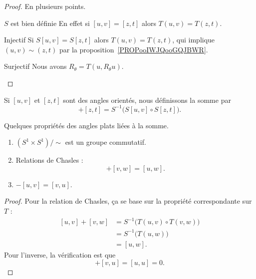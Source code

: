 \begin{proof}
	En plusieurs points.
	\begin{subproof}
		\item[\( S\) est bien définie]
		En effet si \( [u,v]=[z,t]\) alors \( T(u,v)=T(z,t)\).
		\item[Injectif]
		Si \( S[u,v]=S[z,t]\) alors \( T(u,v)=T(z,t)\), qui implique \( (u,v)\sim (z,t)\) par la proposition~\ref{PROPooIWJQooGQJBWR}.
		\item[Surjectif]
		Nous avons \( R_{\theta}=T(u,R_{\theta}u)\).
	\end{subproof}
\end{proof}

\begin{definition}
	Si \( [u,v]\) et \( [z,t]\) sont des angles orientés, nous définissons la somme par
	\begin{equation}
		[u,v]+[z,t]=S^{-1}\Big( S[u,v]\circ S[z,t] \Big).
	\end{equation}
\end{definition}

\begin{lemma}       \label{LEMooWISVooYsStJp}
	Quelques propriétés des angles plats liées à la somme.
	\begin{enumerate}
		\item
		      \( (S^1\times S^1)/\sim\) est un groupe commutatif.
		\item       \label{ITEMooBKTFooWbEvIU}
		      Relations de Chasles :
		      \begin{equation}
			      [u,v]+[v,w]=[u,w].
		      \end{equation}
		\item
		      \( -[u,v]=[v,u]\).
	\end{enumerate}
\end{lemma}

\begin{proof}
	Pour la relation de Chasles, ça se base sur la propriété correspondante sur \( T\) :
	\begin{subequations}
		\begin{align}
			[u,v]+[v,w] & =S^{-1}\Big( T(u,v)\circ T(v,w) \Big) \\
			            & =S^{-1}\big( T(u,w) \big)             \\
			            & =[u,w].
		\end{align}
	\end{subequations}
	Pour l'inverse, la vérification est que
	\begin{equation}
		[u,v]+[v,u]=[u,u]=0.
	\end{equation}
\end{proof}

